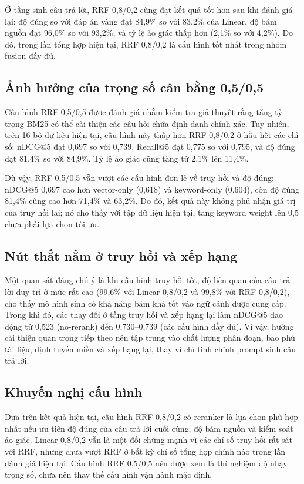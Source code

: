 \documentclass[../DoAn.tex]{subfiles}
\begin{document}
Ở tầng sinh câu trả lời, RRF 0,8/0,2 cũng đạt kết quả tốt hơn sau khi đánh giá
lại: độ đúng so với đáp án vàng đạt 84,9\% so với 83,2\% của Linear, độ bám
nguồn đạt 96,0\% so với 93,2\%, và tỷ lệ ảo giác thấp hơn (2,1\% so với
4,2\%). Do đó, trong lần tổng hợp hiện tại, RRF 0,8/0,2 là cấu hình tốt nhất
trong nhóm fusion đầy đủ.

\subsection{Ảnh hưởng của trọng số cân bằng 0,5/0,5}

Cấu hình RRF 0,5/0,5 được đánh giá nhằm kiểm tra giả thuyết rằng tăng tỷ trọng
BM25 có thể cải thiện các câu hỏi chứa định danh chính xác. Tuy nhiên, trên 16
bộ dữ liệu hiện tại, cấu hình này thấp hơn RRF 0,8/0,2 ở hầu hết các chỉ số:
nDCG@5 đạt 0,697 so với 0,739, Recall@5 đạt 0,775 so với 0,795, và độ đúng đạt
81,4\% so với 84,9\%. Tỷ lệ ảo giác cũng tăng từ 2,1\% lên 11,4\%.

Dù vậy, RRF 0,5/0,5 vẫn vượt các cấu hình đơn lẻ về truy hồi và độ đúng: nDCG@5
0,697 cao hơn vector-only (0,618) và keyword-only (0,604), còn độ đúng 81,4\%
cũng cao hơn 71,4\% và 63,2\%. Do đó, kết quả này không phủ nhận giá trị của
truy hồi lai; nó cho thấy với tập dữ liệu hiện tại, tăng keyword weight lên 0,5
chưa phải lựa chọn tối ưu.

\subsection{Nút thắt nằm ở truy hồi và xếp hạng}

Một quan sát đáng chú ý là khi cấu hình truy hồi tốt, độ liên quan của câu trả
lời duy trì ở mức rất cao (99,6\% với Linear 0,8/0,2 và 99,8\% với RRF
0,8/0,2), cho thấy mô hình sinh có khả năng bám khá tốt vào ngữ cảnh được cung
cấp. Trong khi đó, các thay đổi ở tầng truy hồi và xếp hạng lại làm nDCG@5 dao
động từ 0,523 (no-rerank) đến 0,730--0,739 (các cấu hình đầy đủ). Vì vậy, hướng cải thiện
quan trọng tiếp theo nên tập trung vào chất lượng phân đoạn, bao phủ tài liệu,
định tuyến miền và xếp hạng lại, thay vì chỉ tinh chỉnh prompt sinh câu trả
lời.

\subsection{Khuyến nghị cấu hình}

Dựa trên kết quả hiện tại, cấu hình RRF 0,8/0,2 có reranker là lựa chọn phù hợp
nhất nếu ưu tiên độ đúng của câu trả lời cuối cùng, độ bám nguồn và kiểm soát
ảo giác. Linear 0,8/0,2 vẫn là một đối chứng mạnh vì các chỉ số truy hồi rất
sát với RRF, nhưng chưa vượt RRF ở bất kỳ chỉ số tổng hợp chính nào trong lần
đánh giá hiện tại. Cấu hình RRF 0,5/0,5 nên được xem là thí nghiệm độ nhạy
trọng số, chưa nên thay thế cấu hình vận hành mặc định.
\end{document}

